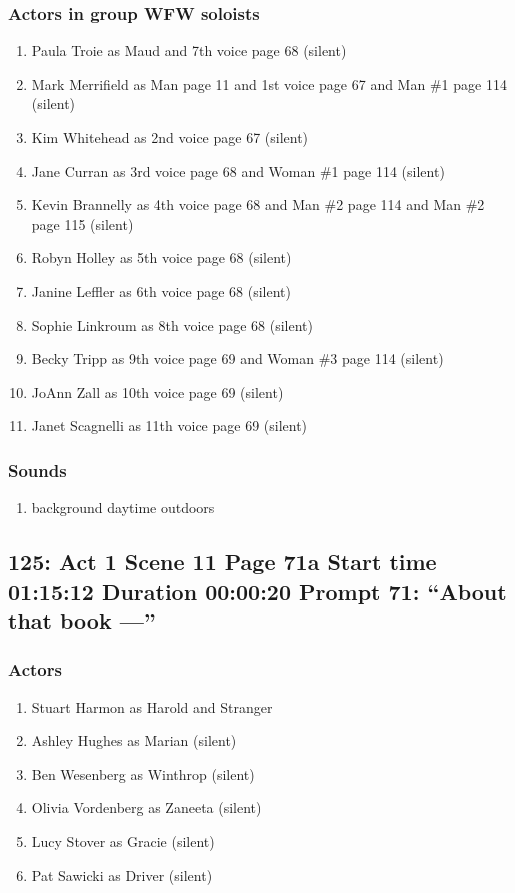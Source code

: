 \subsubsection{Actors in group WFW soloists}
\begin{enumerate}
\item Paula Troie as Maud and 7th voice page 68 (silent)
\item Mark Merrifield as Man page 11 and 1st voice page 67 and Man \#1 page 114 (silent)
\item Kim Whitehead as 2nd voice page 67 (silent)
\item Jane Curran as 3rd voice page 68 and Woman \#1 page 114 (silent)
\item Kevin Brannelly as 4th voice page 68 and Man \#2 page 114 and Man \#2 page 115 (silent)
\item Robyn Holley as 5th voice page 68 (silent)
\item Janine Leffler as 6th voice page 68 (silent)
\item Sophie Linkroum as 8th voice page 68 (silent)
\item Becky Tripp as 9th voice page 69 and Woman \#3 page 114 (silent)
\item JoAnn Zall as 10th voice page 69 (silent)
\item Janet Scagnelli as 11th voice page 69 (silent)
\end{enumerate}

\subsubsection{Sounds}
\begin{enumerate}
\item background daytime outdoors
\end{enumerate}
\subsection{125: Act 1 Scene 11 Page 71a Start time 01:15:12 Duration 00:00:20 Prompt 71: ``About that book ---''}

\subsubsection{Actors}
\begin{enumerate}
\item Stuart Harmon as Harold and Stranger
\item Ashley Hughes as Marian (silent)
\item Ben Wesenberg as Winthrop (silent)
\item Olivia Vordenberg as Zaneeta (silent)
\item Lucy Stover as Gracie (silent)
\item Pat Sawicki as Driver (silent)
\end{enumerate}
